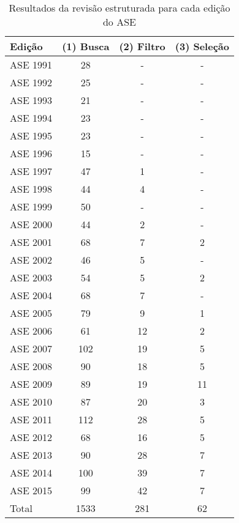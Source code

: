 \begin{table}[h]
\caption{Resultados da revisão estruturada para cada edição do ASE}
\centering
\begin{tabular}{| l | c | c | c |}
  \hline
  Edição & (1) Busca & (2) Filtro & (3) Seleção \\
  \hline
  ASE 1991 & 28    & -         & -           \\
  ASE 1992 & 25    & -         & -           \\
  ASE 1993 & 21    & -         & -           \\
  ASE 1994 & 23    & -         & -           \\
  ASE 1995 & 23    & -         & -           \\
  ASE 1996 & 15    & -         & -           \\
  ASE 1997 & 47    & 1         & -           \\
  ASE 1998 & 44    & 4         & -           \\
  ASE 1999 & 50    & -         & -           \\
  ASE 2000 & 44    & 2         & -           \\
  ASE 2001 & 68    & 7         & 2           \\
  ASE 2002 & 46    & 5         & -           \\
  ASE 2003 & 54    & 5         & 2           \\
  ASE 2004 & 68    & 7         & -           \\
  ASE 2005 & 79    & 9         & 1           \\
  ASE 2006 & 61    & 12        & 2           \\
  ASE 2007 & 102   & 19        & 5           \\
  ASE 2008 & 90    & 18        & 5           \\
  ASE 2009 & 89    & 19        & 11          \\
  ASE 2010 & 87    & 20        & 3           \\
  ASE 2011 & 112   & 28        & 5           \\
  ASE 2012 & 68    & 16        & 5           \\
  ASE 2013 & 90    & 28        & 7           \\
  ASE 2014 & 100   & 39        & 7           \\
  ASE 2015 & 99    & 42        & 7           \\
  \hline
  Total    & 1533  & 281       & 62          \\
  \hline
\end{tabular}
\label{artigos-do-ase}
\end{table}

